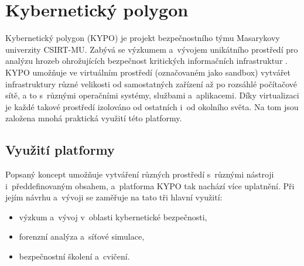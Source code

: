 \documentclass[
  digital, %
  oneside, %
  table,   %
  nolof,     %
  nolot,     %
  nocover
]{fithesis3}
\begin{document}
\chapter{Kybernetický polygon}
Kybernetický polygon (KYPO) je projekt bezpečnostního týmu Masarykovy univerzity CSIRT-MU. Zabývá se výzkumem a~vývojem unikátního prostředí pro analýzu hrozeb ohrožujících bezpečnost kritických informačních infrastruktur \cite{kypocz}. KYPO umožňuje ve virtuálním prostředí (označovaném jako sandbox) vytvářet infrastruktury různé velikosti od samostatných zařízení až po rozsáhlé počítačové sítě, a to s~různými operačními systémy, službami a~aplikacemi. Díky virtualizaci je každé takové prostředí izolováno od ostatních i~od okolního světa. Na tom jsou založena mnohá praktická využití této platformy.

\section{Využití platformy}
Popsaný koncept umožňuje vytváření různých prostředí s~různými nástroji i~předdefinovaným obsahem, a~platforma KYPO tak nachází více uplatnění. Při jejím návrhu a~vývoji se zaměřuje na tato tři hlavní využití: \cite{kypo2017}
\begin{itemize}
\item výzkum a~vývoj v~oblasti kybernetické bezpečnosti,
\item forenzní analýza a~síťové simulace,
\item bezpečnostní školení a~cvičení.
\end{itemize}
\end{document}
